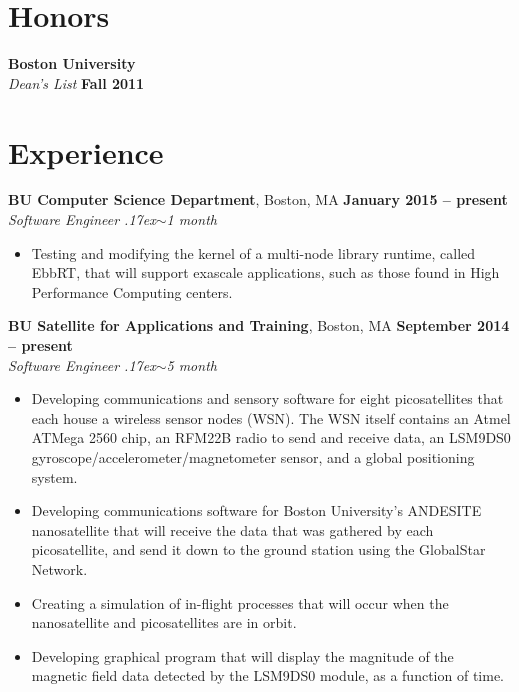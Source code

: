 \documentclass[margin,line,a4paper]{resume}
\newcommand{\about}{\raise.17ex\hbox{$\scriptstyle\mathtt{\sim}$}}
\begin{document}
\begin{resume}
    
    \section{\mysidestyle Honors}
    \textbf{Boston University} \\
    \textsl{Dean's List} \hfill \textbf{Fall 2011}
    
    
    \section{\mysidestyle Experience}

    \textbf{BU Computer Science Department}, Boston, MA \hfill \textbf{January 2015 -- present} \\
    \textsl{Software Engineer \hfill \about 1 month}
    \vspace{1mm}
    \begin{itemize}[leftmargin=2em]
        \item Testing and modifying the kernel of a multi-node library runtime,
          called EbbRT, that will support exascale applications, such as those found
          in High Performance Computing centers.
    \end{itemize}
    
    \textbf{BU Satellite for Applications and Training}, Boston, MA \hfill \textbf{September 2014 -- present} \\
    \textsl{Software Engineer \hfill \about 5 month}
    \vspace{1mm}
    \begin{itemize}[leftmargin=2em]
        \item Developing communications and sensory software for eight picosatellites
          that each house a wireless sensor nodes (WSN). The WSN itself contains an
          Atmel ATMega 2560 chip, an RFM22B radio to send and receive data, an
          LSM9DS0 gyroscope/accelerometer/magnetometer sensor, and a global
          positioning system.
        \item Developing communications software for Boston University's ANDESITE
          nanosatellite that will receive the data that was gathered by each
          picosatellite, and send it down to the ground station using the GlobalStar Network.
        \item Creating a simulation of in-flight processes that will occur when the
          nanosatellite and picosatellites are in orbit.
        \item Developing graphical program that will display the magnitude of the magnetic
          field data detected by the LSM9DS0 module, as a function of time. 
    \end{itemize}


\end{resume}
\end{document}

